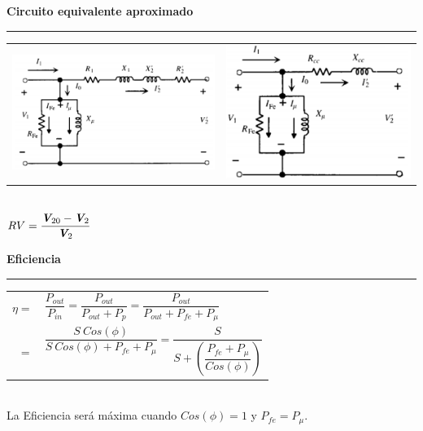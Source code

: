 \documentclass[11pt,a4paper]{article}
\newcommand{\fasor}[1]{\uppercase{\textit{\textbf{#1}}}}
\newcommand{\subtitulo}[1]{
    \textbf{#1} \\ \vspace{.1cm} {\color{gray} \hrule}
}
\begin{document}
    \begin{cajita}
        \begin{center}
            \subtitulo{Circuito equivalente aproximado  }
            \begin{tabular}{c c}
                \includegraphics[width=6 cm,height=3.5 cm]{equi-aprox-1}& \includegraphics[width=6 cm,height=3.5 cm]{equi-aprox-2}
            \end{tabular}\\
            $RV=\dfrac{\fasor{V}_{20}-\fasor{V}_{2}}{\fasor{V}_{2}}$\\
            \vspace*{0.25cm}
            \subtitulo{Eficiencia}
            \vspace*{0.25cm}
            \begin{tabular}{r l}
                $\eta =$&$ \dfrac{P_{out}}{P_{in}}=\dfrac{P_{out}}{P_{out}+P_{p}}=\dfrac{P_{out}}{P_{out}+P_{fe}+P_{\mu}}$ \\[0.5 cm]
                $=$&$\dfrac{S~Cos(\phi)}{S~Cos(\phi )+P_{fe}+P_{\mu}}=
                \dfrac{S}{S+\left(\dfrac{P_{fe}+P_{\mu}}{Cos(\phi)}\right)}$\\[0.8 cm]
            \end{tabular}\\
            La Eficiencia será máxima cuando $Cos(\phi)=1$ y $ P_{fe}=P_{\mu }$.
        \end{center}


    \end{cajita}
\end{document}
